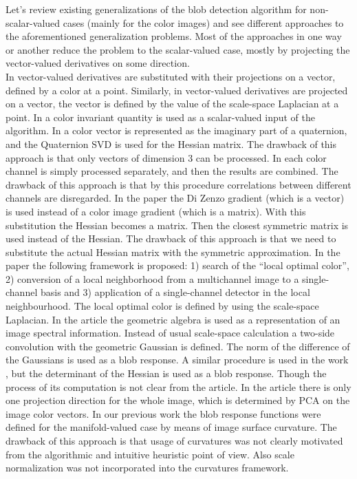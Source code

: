 \documentclass[twocolumn]{svjour3}          %
\begin{document}
Let's review existing generalizations of the blob detection algorithm for non-scalar-valued cases (mainly for the color images) and see different approaches to the aforementioned generalization problems. Most of the approaches in one way or another reduce the problem to the scalar-valued case, mostly by projecting the vector-valued derivatives on some direction. 
\\
In \cite{ColorBlobRGB} vector-valued derivatives are substituted with their projections on a vector, defined by a color at a point. Similarly, in \cite{ColorBlob, ColorBlob2} vector-valued derivatives are projected on a vector, the vector is defined by the value of the scale-space Laplacian at a point. In \cite{ColorSIFT} a color invariant quantity is used as a scalar-valued input of the algorithm. In \cite{QuaternionColorCurv} a color vector is represented as the imaginary part of a quaternion, and the Quaternion SVD is used for the Hessian matrix. The drawback of this approach is that only vectors of dimension 3 can be processed. In \cite{ColorSURF} each color channel is simply processed separately, and then the results are combined. The drawback of this approach is that by this procedure correlations between different channels are disregarded. In the paper \cite{MRIBlob} the Di Zenzo gradient \cite{DiZenzo} (which is a vector) is used instead of a color image gradient (which is a matrix). With this substitution the Hessian becomes a matrix. Then the closest symmetric matrix is used instead of the Hessian. The drawback of this approach is that we need to substitute the actual Hessian matrix with the symmetric approximation. In the paper \cite{GROM} the following framework is proposed: 1) search of the “local optimal color”, 2) conversion of a local neighborhood from a multichannel image to a single-channel basis and 3) application of a single-channel detector in the local neighbourhood. The local optimal color is defined by using the scale-space Laplacian. In the article \cite{GA_SIFT} the geometric algebra is used as a representation of an image spectral information. Instead of usual scale-space calculation a two-side convolution with the geometric Gaussian is defined. The norm of the difference of the Gaussians is used as a blob response. A similar procedure is used in the work \cite{GA_SURF}, but the determinant of the Hessian is used as a blob response. Though the process of its computation is not clear from the article. In the article \cite{OnePCA} there is only one projection direction for the whole image, which is determined by PCA on the image color vectors. In our previous work \cite{RiemannianBlob} the blob response functions were defined for the manifold-valued case by means of image surface curvature. The drawback of this approach is that usage of curvatures was not clearly motivated from the algorithmic and intuitive heuristic point of view. Also scale normalization was not incorporated into the curvatures framework.
\end{document}
